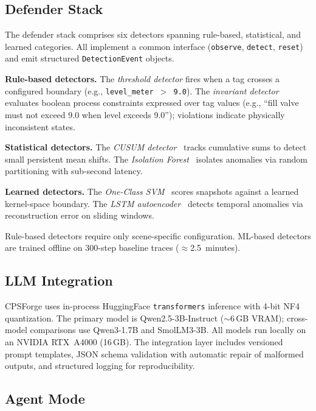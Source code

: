 \subsection{Defender Stack}
\label{sec:impl:defenders}

The defender stack comprises six detectors spanning rule-based, statistical, and learned categories. All implement a common interface (\texttt{observe}, \texttt{detect}, \texttt{reset}) and emit structured \texttt{DetectionEvent} objects.

\textbf{Rule-based detectors.} The \emph{threshold detector} fires when a tag crosses a configured boundary (e.g., \texttt{level\_meter~$>$~9.0}). The \emph{invariant detector} evaluates boolean process constraints expressed over tag values (e.g., ``fill valve must not exceed 9.0 when level exceeds 9.0''); violations indicate physically inconsistent states.

\textbf{Statistical detectors.} The \emph{CUSUM detector}~\cite{page1954continuous} tracks cumulative sums to detect small persistent mean shifts. The \emph{Isolation Forest}~\cite{liu2008isolation} isolates anomalies via random partitioning with sub-second latency.

\textbf{Learned detectors.} The \emph{One-Class SVM}~\cite{scholkopf2001estimating} scores snapshots against a learned kernel-space boundary. The \emph{LSTM autoencoder}~\cite{malhotra2016lstm} detects temporal anomalies via reconstruction error on sliding windows.

Rule-based detectors require only scene-specific configuration. ML-based detectors are trained offline on 300-step baseline traces ($\approx$2.5~minutes).

\subsection{LLM Integration}
\label{sec:impl:llm}

CPSForge uses in-process HuggingFace \texttt{transformers} inference with 4-bit NF4 quantization. The primary model is Qwen2.5-3B-Instruct (${\sim}$6\,GB VRAM); cross-model comparisons use Qwen3-1.7B and SmolLM3-3B. All models run locally on an NVIDIA RTX~A4000 (16\,GB). The integration layer includes versioned prompt templates, JSON schema validation with automatic repair of malformed outputs, and structured logging for reproducibility.

\subsection{Agent Mode}
\label{sec:impl:agent}

